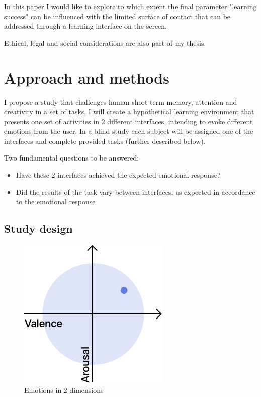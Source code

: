 In this paper I would like to explore to which extent the final parameter "learning success" can be influenced with the limited surface of contact that can be addressed through a learning interface on the screen.

Ethical, legal and social considerations are also part of my thesis.

\section{Approach and methods}

I propose a study that challenges human short-term memory, attention and creativity in a set of tasks. I will create a hypothetical learning environment that presents one set of activities in 2 different interfaces, intending to evoke different emotions from the user. In a blind study each subject will be assigned one of the interfaces and complete provided tasks (further described below).

Two fundamental questions to be answered:

\noindent
\colorbox{ltgrey}{
	\parbox{\textwidth}{
		\begin{itemize}
			\item Have these 2 interfaces achieved the expected emotional response?
			\item Did the results of the task vary between interfaces, as expected in accordance to the emotional response
		\end{itemize}
	}
}

\subsection{Study design}

\begin{figure}
	\centering
	\includegraphics[width=0.25\linewidth]{images/valence-arousal.png}
	\caption[Emotions in 2 dimensions]{Emotions in 2 dimensions}
	\label{fig:valence-arousal}
\end{figure}

